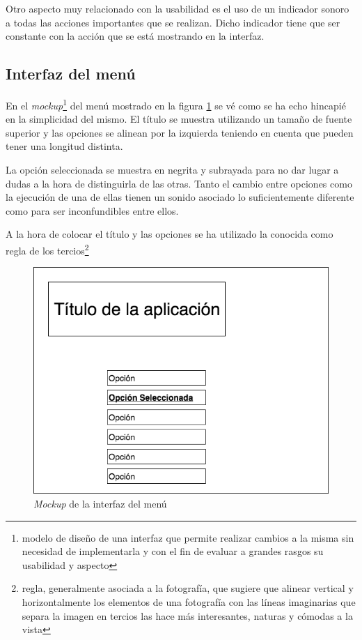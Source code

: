 \bigskip

Otro aspecto muy relacionado con la usabilidad es el uso de un indicador sonoro a todas las acciones importantes que se realizan. Dicho indicador tiene que ser constante con la acción que se está mostrando en la interfaz.

\subsection{Interfaz del menú}

En el \textit{mockup}\footnote{modelo de diseño de una interfaz que permite realizar cambios a la misma sin necesidad de implementarla y con el fin de evaluar a grandes rasgos su usabilidad y aspecto} del menú mostrado en la figura \ref{inter:menu} se vé como se ha echo hincapié en la simplicidad del mismo. El título se muestra utilizando un tamaño de fuente superior y las opciones se alinean por la izquierda teniendo en cuenta que pueden tener una longitud distinta.

\bigskip

La opción seleccionada se muestra en negrita y subrayada para no dar lugar a dudas a la hora de distinguirla de las otras. Tanto el cambio entre opciones como la ejecución de una de ellas tienen un sonido asociado lo suficientemente diferente como para ser inconfundibles entre ellos.

\bigskip A la hora de colocar el título y las opciones se ha utilizado la conocida como regla de los tercios\footnote{regla, generalmente asociada a la fotografía, que sugiere que alinear vertical y horizontalmente los elementos de una fotografía con las líneas imaginarias que separa la imagen en tercios las hace más interesantes, naturas y cómodas a la vista}

\begin{figure}
	\centerline{\includegraphics[width=12cm]{otros/graphicalInterface/menu.png}}
	\caption{\textit{Mockup} de la interfaz del menú}
	\label{inter:menu}
\end{figure}

